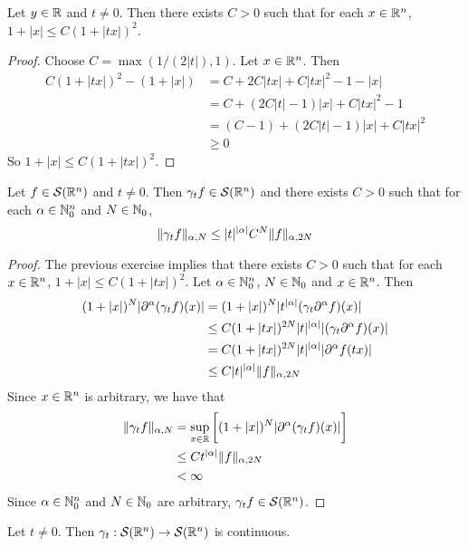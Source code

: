 \documentclass{book}
\begin{document}
	\begin{ex} Let $y \in \mathbb{R}$ and $t \neq 0$. Then there exists $C > 0$ such that for each $x \in \mathbb{R}^n$, $1+|x| \leq C(1 + |tx|)^2$.
	\end{ex}
	
	\begin{proof}
		Choose $C = \max(1/(2|t|), 1)$. Let $x \in \mathbb{R}^n$. Then 
		\begin{align*}
			C(1 + |tx|)^2 - (1 + |x|) 
			& = C + 2C|tx| + C|tx|^2 - 1 - |x| \\
			& = C + (2C|t| - 1)|x| + C|tx|^2 - 1 \\
			& = (C-1) + (2C|t| - 1)|x| + C|tx|^2 \\
			& \geq 0
		\end{align*}
		So $1 + |x| \leq C(1 + |tx|)^2$. 
	\end{proof}

	\begin{ex}
		Let $f \in \mathcal{S}(\mathbb{R}^n)$ and $t \neq 0$. Then $ \gamma_t f \in \mathcal{S}(\mathbb{R}^n)$ and there exists $C > 0$ such that for each $\alpha \in \mathbb{N}_0^n$ and $N \in \mathbb{N}_0$, 
		$$\| \gamma_t f\|_{\alpha, N} \leq |t|^{|\alpha|} C^N\|f\|_{\alpha, 2N}$$
	\end{ex}
	
	\begin{proof}
		The previous exercise implies that there exists $C > 0$ such that for each $x \in \mathbb{R}^n$, $1+|x| \leq C(1 + |tx|)^2$. Let $\alpha \in \mathbb{N}_0^n$, $N \in \mathbb{N}_0$ and $x \in \mathbb{R}^n$. Then  
		\begin{align*}
			(1+|x|)^N |\partial^{\alpha}( \gamma_t f)(x)|
			& = (1+|x|)^N |t^{|\alpha|} (\gamma_t \partial^{\alpha} f)(x)| \\
			& \leq C(1+|tx|)^{2N} |t|^{|\alpha|} |(\gamma_t \partial^{\alpha} f)(x)| \\
			& = C(1+|tx|)^{2N} |t|^{|\alpha|}  |\partial^{\alpha} f(tx)| \\
			& \leq C |t|^{|\alpha|} \|f\|_{\alpha, 2N}
		\end{align*}
		Since $x \in \mathbb{R}^n$ is arbitrary, we have that
		\begin{align*}
			\|\gamma_t f\|_{\alpha, N}
			& = \sup_{x \in \mathbb{R}} \bigg[ (1+|x|)^N |\partial^{\alpha} (\gamma_t f)(x)|\bigg] \\
			& \leq C t^{|\alpha|} \|f\|_{\alpha, 2N} \\
			& < \infty
		\end{align*}
		Since $\alpha \in \mathbb{N}_0^n$ and $N \in \mathbb{N}_0$ are arbitrary, $\gamma_t f \in \mathcal{S}(\mathbb{R}^n)$.
	\end{proof}
	
	\begin{ex}
		Let $t \neq 0$. Then $\gamma_t: \mathcal{S}(\mathbb{R}^n) \rightarrow \mathcal{S}(\mathbb{R}^n)$ is continuous.
	\end{ex}
	
\end{document}
